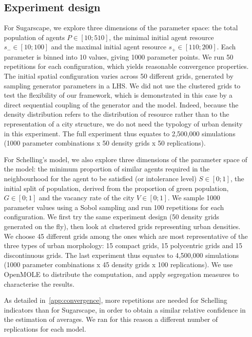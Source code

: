 \documentclass{JASSS}
\begin{document}
\subsection{Experiment design}
For Sugarscape, we explore three dimensions of the parameter space: the total population of agents $P\in \left[10;510\right]$, the minimal initial agent resource $s_{-}\in \left[10;100\right]$ and the maximal initial agent resource $s_{+}\in \left[110;200\right]$. Each parameter is binned into 10 values, giving 1000 parameter points. We run 50 repetitions for each configuration, which yields reasonable convergence properties. The initial spatial configuration varies across 50 different grids, generated by sampling generator parameters in a LHS. We did not use the clustered grids to test the flexibility of our framework, which is demonstrated in this case by a direct sequential coupling of the generator and the model. Indeed, because the density distribution refers to the distribution of resource rather than to the representation of a city structure, we do not need the typology of urban density in this experiment. The full experiment thus equates to 2,500,000 simulations (1000 parameter combinations x 50 density grids x 50 replications). 

For Schelling's model, we also explore three dimensions of the parameter space of the model: the minimum proportion of similar agents required in the neighbourhood for the agent to be satisfied (or intolerance level) $S\in \left[0;1\right]$, the initial split of population, derived from the proportion of green population, $G\in \left[0;1\right]$ and the vacancy rate of the city $V\in \left[0;1\right]$. We sample 1000 parameter values using a Sobol sampling and run 100 repetitions for each configuration. We first try the same experiment design (50 density grids generated on the fly), then look at clustered grids representing urban densities. We choose 45 different grids among the ones which are most representative of the three types of urban morphology: 15 compact grids, 15 polycentric grids and 15 discontinuous grids. The last experiment thus equates to 4,500,000 simulations (1000 parameter combinations x 45 density grids x 100 replications). We use OpenMOLE to distribute the computation, and apply segregation measures to characterise the results.

As detailed in~\ref{app:convergence}, more repetitions are needed for Schelling indicators than for Sugarscape, in order to obtain a similar relative confidence in the estimation of averages. We ran for this reason a different number of replications for each model.
\end{document}
